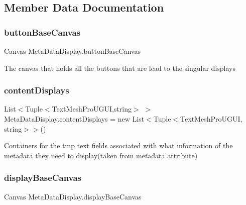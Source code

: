 \subsection{Member Data Documentation}
\mbox{\label{class_meta_data_display_aafcc610f0d96f968cda456a0a4ec539f}} 
\subsubsection{\texorpdfstring{button\+Base\+Canvas}{buttonBaseCanvas}}
{\footnotesize\ttfamily Canvas Meta\+Data\+Display.\+button\+Base\+Canvas\hspace{0.3cm}{\ttfamily [private]}}



The canvas that holds all the buttons that are lead to the singular displays 

\mbox{\label{class_meta_data_display_a347d0dacfa16900eb101f45904a89f73}} 
\subsubsection{\texorpdfstring{content\+Displays}{contentDisplays}}
{\footnotesize\ttfamily List$<$Tuple$<$Text\+Mesh\+Pro\+U\+G\+UI,string$>$ $>$ Meta\+Data\+Display.\+content\+Displays = new List$<$Tuple$<$Text\+Mesh\+Pro\+U\+G\+UI, string$>$$>$()\hspace{0.3cm}{\ttfamily [private]}}



Containers for the tmp text fields associated with what information of the metadata they need to display(taken from metadata attribute) 

\mbox{\label{class_meta_data_display_ab6cf1e74b49c27d63fcc863d1be99aa6}} 
\subsubsection{\texorpdfstring{display\+Base\+Canvas}{displayBaseCanvas}}
{\footnotesize\ttfamily Canvas Meta\+Data\+Display.\+display\+Base\+Canvas\hspace{0.3cm}{\ttfamily [private]}}



